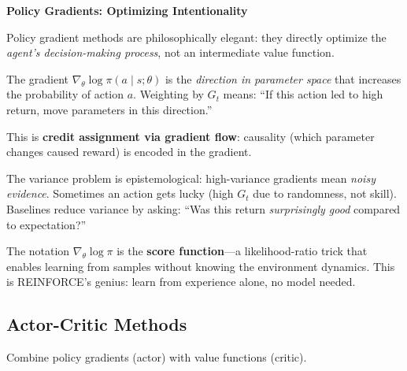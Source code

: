 \begin{philobox}
\textbf{Policy Gradients: Optimizing Intentionality}

Policy gradient methods are philosophically elegant: they directly optimize the \textit{agent's decision-making process}, not an intermediate value function.

The gradient $\nabla_\theta \log \pi(a \mid s; \theta)$ is the \textit{direction in parameter space} that increases the probability of action $a$. Weighting by $G_t$ means: ``If this action led to high return, move parameters in this direction.''

This is \textbf{credit assignment via gradient flow}: causality (which parameter changes caused reward) is encoded in the gradient.

The variance problem is epistemological: high-variance gradients mean \textit{noisy evidence}. Sometimes an action gets lucky (high $G_t$ due to randomness, not skill). Baselines reduce variance by asking: ``Was this return \textit{surprisingly good} compared to expectation?''

The notation $\nabla_\theta \log \pi$ is the \textbf{score function}---a likelihood-ratio trick that enables learning from samples without knowing the environment dynamics. This is REINFORCE's genius: learn from experience alone, no model needed.
\end{philobox}

\subsection{Actor-Critic Methods}

Combine policy gradients (actor) with value functions (critic).

